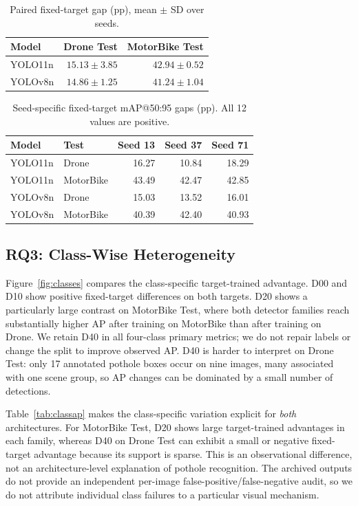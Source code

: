 \documentclass[conference,a4paper]{IEEEtran}
\begin{document}
\begin{table}[t]
\centering\caption{Paired fixed-target gap (pp), mean $\pm$ SD over seeds.}\label{tab:paired}
\begin{tabular}{lrr}\toprule
Model & Drone Test & MotorBike Test\\\midrule
YOLO11n & $15.13\pm3.85$ & $42.94\pm0.52$\\
YOLOv8n & $14.86\pm1.25$ & $41.24\pm1.04$\\\bottomrule
\end{tabular}
\end{table}

\begin{table}[t]
\centering\caption{Seed-specific fixed-target mAP@50:95 gaps (pp). All 12 values are positive.}\label{tab:seeds}
\begin{tabular}{llrrr}\toprule
Model & Test & Seed 13 & Seed 37 & Seed 71\\\midrule
YOLO11n & Drone & 16.27 & 10.84 & 18.29 \\
YOLO11n & MotorBike & 43.49 & 42.47 & 42.85 \\
YOLOv8n & Drone & 15.03 & 13.52 & 16.01 \\
YOLOv8n & MotorBike & 40.39 & 42.40 & 40.93 \\\bottomrule
\end{tabular}
\end{table}

\subsection{RQ3: Class-Wise Heterogeneity}
Figure~\ref{fig:classes} compares the class-specific target-trained advantage. D00 and D10 show positive fixed-target differences on both targets. D20 shows a particularly large contrast on MotorBike Test, where both detector families reach substantially higher AP after training on MotorBike than after training on Drone. We retain D40 in all four-class primary metrics; we do not repair labels or change the split to improve observed AP. D40 is harder to interpret on Drone Test: only 17 annotated pothole boxes occur on nine images, many associated with one scene group, so AP changes can be dominated by a small number of detections.

Table~\ref{tab:classap} makes the class-specific variation explicit for \emph{both} architectures. For MotorBike Test, D20 shows large target-trained advantages in each family, whereas D40 on Drone Test can exhibit a small or negative fixed-target advantage because its support is sparse. This is an observational difference, not an architecture-level explanation of pothole recognition. The archived outputs do not provide an independent per-image false-positive/false-negative audit, so we do not attribute individual class failures to a particular visual mechanism.
\end{document}
